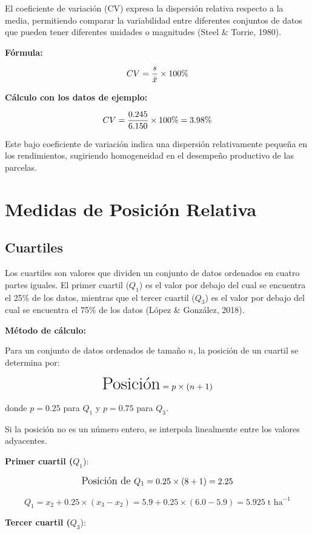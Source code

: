 \documentclass[
  spanish,
  letterpaper,
]{book}
\begin{document}
El coeficiente de variación (CV) expresa la dispersión relativa respecto
a la media, permitiendo comparar la variabilidad entre diferentes
conjuntos de datos que pueden tener diferentes unidades o magnitudes
(Steel \& Torrie, 1980).

\textbf{Fórmula:}

\[\huge CV = \frac{s}{\bar{x}} \times 100\%\]

\textbf{Cálculo con los datos de ejemplo:}

\[\LARGE CV = \frac{0.245}{6.150} \times 100\% = 3.98\%\]

Este bajo coeficiente de variación indica una dispersión relativamente
pequeña en los rendimientos, sugiriendo homogeneidad en el desempeño
productivo de las parcelas.

\section{Medidas de Posición
Relativa}\label{medidas-de-posiciuxf3n-relativa}

\subsection{Cuartiles}\label{cuartiles}

Los cuartiles son valores que dividen un conjunto de datos ordenados en
cuatro partes iguales. El primer cuartil (\(Q_1\)) es el valor por
debajo del cual se encuentra el 25\% de los datos, mientras que el
tercer cuartil (\(Q_3\)) es el valor por debajo del cual se encuentra el
75\% de los datos (López \& González, 2018).

\textbf{Método de cálculo:}

Para un conjunto de datos ordenados de tamaño \(n\), la posición de un
cuartil se determina por:

\[\huge \text{Posición} = p \times (n+1)\]

donde \(p = 0.25\) para \(Q_1\) y \(p = 0.75\) para \(Q_3\).

Si la posición no es un número entero, se interpola linealmente entre
los valores adyacentes.

\textbf{Primer cuartil (}\(Q_1\)):

\[\large\text{Posición de } Q_1 = 0.25 \times (8+1) = 2.25\]

\[Q_1 = x_2 + 0.25 \times (x_3 - x_2) = 5.9 + 0.25 \times (6.0 - 5.9) = 5.925\; \text{t ha}^{-1}\]

\textbf{Tercer cuartil (}\(Q_3\)):
\end{document}
